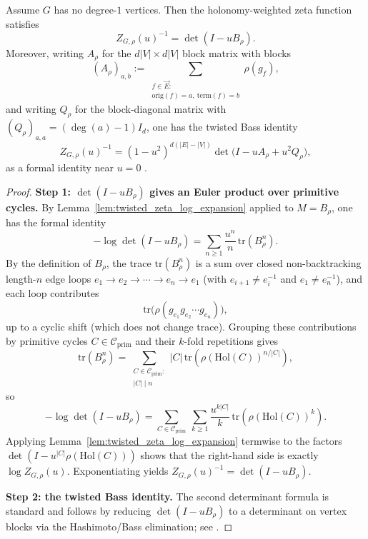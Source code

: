 \begin{theorem}\label{thm:twisted_ihara_determinant}
\MathTag Assume $G$ has no degree-$1$ vertices.
Then the holonomy-weighted zeta function satisfies
\[
Z_{G,\rho}(u)^{-1}=\det(I-uB_\rho).
\]
Moreover, writing $A_\rho$ for the $d|V|\times d|V|$ block matrix with blocks
\[
(A_\rho)_{a,b}:=
\sum_{\substack{f\in\overrightarrow{E}:\\ \mathrm{orig}(f)=a,\ \mathrm{term}(f)=b}} \rho(g_f),
\]
and writing $Q_\rho$ for the block-diagonal matrix with $(Q_\rho)_{a,a}=(\deg(a)-1)I_d$, one has the twisted Bass identity
\[
Z_{G,\rho}(u)^{-1}=(1-u^2)^{d(|E|-|V|)}\det\!\bigl(I-uA_\rho+u^2 Q_\rho\bigr),
\]
as a formal identity near $u=0$ \cite{Hashimoto1989,Bass1992,Terras2010}.
\end{theorem}
\begin{proof}
\noindent\textbf{Step 1: $\det(I-uB_\rho)$ gives an Euler product over primitive cycles.}
By Lemma~\ref{lem:twisted_zeta_log_expansion} applied to $M=B_\rho$, one has the formal identity
\[
-\log\det(I-uB_\rho)=\sum_{n\ge 1}\frac{u^n}{n}\,\mathrm{tr}(B_\rho^n).
\]
By the definition of $B_\rho$, the trace $\mathrm{tr}(B_\rho^n)$ is a sum over closed non-backtracking length-$n$ edge loops
$e_1\to e_2\to\cdots\to e_n\to e_1$ (with $e_{i+1}\neq e_i^{-1}$ and $e_1\neq e_n^{-1}$), and each loop contributes
\[
\mathrm{tr}\!\bigl(\rho(g_{e_1}g_{e_2}\cdots g_{e_n})\bigr),
\]
up to a cyclic shift (which does not change trace).
Grouping these contributions by primitive cycles $C\in\mathcal{C}_{\mathrm{prim}}$ and their $k$-fold repetitions gives
\[
\mathrm{tr}(B_\rho^n)=\sum_{\substack{C\in\mathcal{C}_{\mathrm{prim}}:\\ |C|\mid n}}
|C|\,\mathrm{tr}\!\left(\rho(\mathrm{Hol}(C))^{n/|C|}\right),
\]
so
\[
-\log\det(I-uB_\rho)
=\sum_{C\in\mathcal{C}_{\mathrm{prim}}}\ \sum_{k\ge 1}\frac{u^{k|C|}}{k}\,
\mathrm{tr}\!\left(\rho(\mathrm{Hol}(C))^{k}\right).
\]
Applying Lemma~\ref{lem:twisted_zeta_log_expansion} termwise to the factors
$\det(I-u^{|C|}\rho(\mathrm{Hol}(C)))$ shows that the right-hand side is exactly
$\log Z_{G,\rho}(u)$.
Exponentiating yields $Z_{G,\rho}(u)^{-1}=\det(I-uB_\rho)$.
\par
\noindent\textbf{Step 2: the twisted Bass identity.}
The second determinant formula is standard and follows by reducing $\det(I-uB_\rho)$ to a determinant on vertex blocks via the Hashimoto/Bass elimination; see \cite{Hashimoto1989,Bass1992,Terras2010}.
\end{proof}

